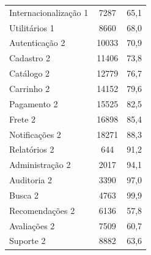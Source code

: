 \documentclass[12pt, a5paper, brazilian]{abntex2}
\begin{document}
{\begin{longtable}{@{\extracolsep{\fill}} l
                  S[table-format=5.0] S[table-format=3.1]}
  Internacionalização 1      &  7287 &  65,1 \\
  Utilitários 1              &  8660 &  68,0 \\
  Autenticação 2             & 10033 &  70,9 \\
  Cadastro 2                 & 11406 &  73,8 \\
  Catálogo 2                 & 12779 &  76,7 \\
  Carrinho 2                 & 14152 &  79,6 \\
  Pagamento 2                & 15525 &  82,5 \\
  Frete 2                    & 16898 &  85,4 \\
  Notificações 2             & 18271 &  88,3 \\
  Relatórios 2               &   644 &  91,2 \\
  Administração 2            &  2017 &  94,1 \\
  Auditoria 2                &  3390 &  97,0 \\
  Busca 2                    &  4763 &  99,9 \\
  Recomendações 2            &  6136 &  57,8 \\
  Avaliações 2               &  7509 &  60,7 \\
  Suporte 2                  &  8882 &  63,6 \\
\end{longtable}
}
\nopagebreak
{}
\end{document}
